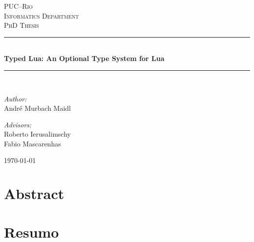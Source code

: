 \documentclass[pdftex,12pt,a4paper]{report}
\begin{document}
\begin{titlepage}
\begin{center}

\textsc{\LARGE PUC--Rio}\\[1.5cm]
\textsc{\Large Informatics Department}\\[1.0cm]
\textsc{\Large PhD Thesis}\\[0.5cm]

\newcommand{\HRule}{\rule{\linewidth}{0.5mm}}
\HRule \\[0.4cm]
{\huge \bfseries Typed Lua: An Optional Type System for Lua}\\[0.4cm]
\HRule \\[1.5cm]

\begin{minipage}{0.4\textwidth}
\begin{flushleft} \large
\emph{Author:}\\
André Murbach Maidl
\end{flushleft}
\end{minipage}
\begin{minipage}{0.4\textwidth}
\begin{flushright} \large
\emph{Advisors:} \\
Roberto Ierusalimschy \\
Fabio Mascarenhas
\end{flushright}
\end{minipage}

\vfill
{\large \today}

\end{center}
\end{titlepage}


\newpage
\setcounter{page}{1}

\tableofcontents

\listoffigures
{}

\listoftables
{}

\chapter*{Abstract}


\chapter*{Resumo}

\end{document}

